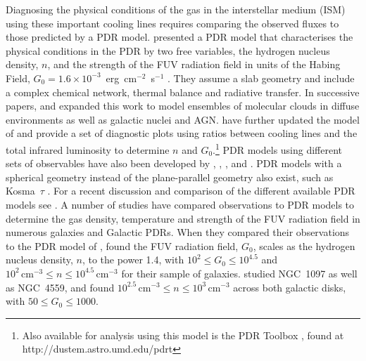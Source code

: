 \documentclass[preprint2]{aastex}
\begin{document}
Diagnosing the physical conditions of the gas in the interstellar medium (ISM) using these important cooling lines requires comparing the observed fluxes to those predicted by a PDR model.  \citet{1985ApJ...291..722T} presented a PDR model that characterises the physical conditions in the PDR by two free variables, the hydrogen nucleus density, $n$, and the strength of the FUV radiation field in units of the Habing Field, $G_0 = 1.6 \times 10^{-3}$~erg~cm$^{-2}$~s$^{-1}$ \citep{1968BAN....19..421H}.  They assume a slab geometry and include a complex chemical network, thermal balance and radiative transfer.  In successive papers, \citet{1990ApJ...358..116W} and \cite{1991ApJ...377..192H} expanded this work to model ensembles of molecular clouds in diffuse environments as well as galactic nuclei and AGN.  \citet{1999ApJ...527..795K,2006ApJ...644..283K} have further updated the model of \citet{1990ApJ...358..116W} and provide a set of diagnostic plots using ratios between cooling lines and the total infrared luminosity to determine $n$ and $G_0$.\footnote{Also available for analysis using this model is the PDR Toolbox \citep{2008ASPC..394..654P}, found at http://dustem.astro.umd.edu/pdrt}  PDR models using different sets of observables have also been developed by \citet{1986ApJS...62..109V,1988ApJ...334..771V}, \citet{1989ApJ...338..197S, 1995ApJS...99..565S}, \citet{1997ApJ...482..298L}, \citet{2000A&A...358..682S} and \citet{2006ApJS..164..506L}.  PDR models with a spherical geometry instead of the plane-parallel geometry also exist, such as Kosma~$\tau$ \citep[e.g.][]{2006A&A...451..917R}.  For a recent discussion and comparison of the different available PDR models see \citet{2007A&A...467..187R}. A number of studies have compared observations to PDR models to determine the gas density, temperature and strength of the FUV radiation field in numerous galaxies and Galactic PDRs.  When they compared their observations to the PDR model of \citet{1999ApJ...527..795K}, \citet{2001ApJ...561..766M} found the FUV radiation field, $G_{0}$, scales as the hydrogen nucleus density, $n$, to the power 1.4, with $10^{2} \le G_{0} \le 10^{4.5}$ and $10^{2}\,\mathrm{cm}^{-3} \le n \le 10^{4.5}\,\mathrm{cm}^{-3}$ for their sample of galaxies.  \citet{2012ApJ...747...81C} studied NGC~1097 as well as NGC~4559, and found $10^{2.5}\,\mathrm{cm}^{-3} \le n \le 10^{3}\,\mathrm{cm}^{-3}$ across both galactic disks, with $50 \le G_{0} \le 1000$.
\end{document}
